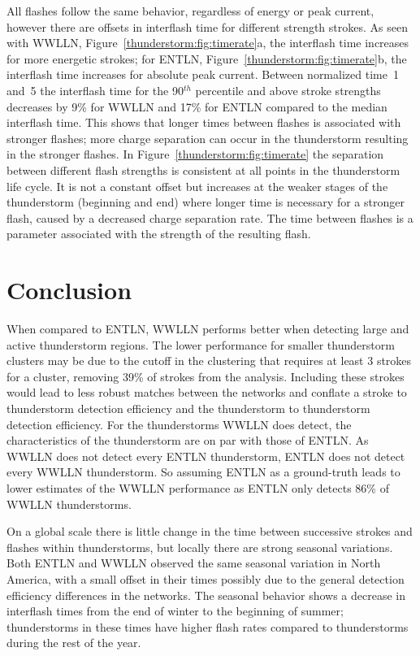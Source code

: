 All flashes follow the same behavior, regardless of energy or peak current, however there are offsets in interflash time for different strength strokes.
As seen with WWLLN, Figure~\ref{thunderstorm:fig:timerate}a, the interflash time increases for more energetic strokes; for ENTLN, Figure~\ref{thunderstorm:fig:timerate}b, the interflash time increases for absolute peak current.
Between normalized time~1 and~5 the interflash time for the 90$^{th}$ percentile and above stroke strengths decreases by 9\% for WWLLN and 17\% for ENTLN compared to the median interflash time.
This shows that longer times between flashes is associated with stronger flashes; more charge separation can occur in the thunderstorm resulting in the stronger flashes.
In Figure~\ref{thunderstorm:fig:timerate} the separation between different flash strengths is consistent at all points in the thunderstorm life cycle.
It is not a constant offset but increases at the weaker stages of the thunderstorm (beginning and end) where longer time is necessary for a stronger flash, caused by a decreased charge separation rate.
The time between flashes is a parameter associated with the strength of the resulting flash.

\section{Conclusion}


When compared to ENTLN, WWLLN performs better when detecting large and active thunderstorm regions.
The lower performance for smaller thunderstorm clusters may be due to the cutoff in the clustering that requires at least 3 strokes for a cluster, removing 39\% of strokes from the analysis.
Including these strokes would lead to less robust matches between the networks and conflate a stroke to thunderstorm detection efficiency and the thunderstorm to thunderstorm detection efficiency.
For the thunderstorms WWLLN does detect, the characteristics of the thunderstorm are on par with those of ENTLN.
As WWLLN does not detect every ENTLN thunderstorm, ENTLN does not detect every WWLLN thunderstorm.
So assuming ENTLN as a ground-truth leads to lower estimates of the WWLLN performance as ENTLN only detects 86\% of WWLLN thunderstorms.


On a global scale there is little change in the time between successive strokes and flashes within thunderstorms, but locally there are strong seasonal variations.
Both ENTLN and WWLLN observed the same seasonal variation in North America, with a small offset in their times possibly due to the general detection efficiency differences in the networks.
The seasonal behavior shows a decrease in interflash times from the end of winter to the beginning of summer; thunderstorms in these times have higher flash rates compared to thunderstorms during the rest of the year.

